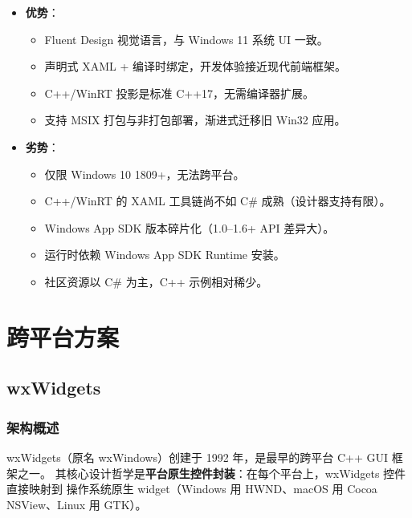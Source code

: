 \documentclass[12pt,a4paper,fontset=fandol]{ctexbook}
\begin{document}
\begin{compare}[title=WinUI 3 优劣分析]
\begin{itemize}
  \item \textbf{优势}：
    \begin{itemize}
      \item Fluent Design 视觉语言，与 Windows 11 系统 UI 一致。
      \item 声明式 XAML + 编译时绑定，开发体验接近现代前端框架。
      \item C++/WinRT 投影是标准 C++17，无需编译器扩展。
      \item 支持 MSIX 打包与非打包部署，渐进式迁移旧 Win32 应用。
    \end{itemize}
  \item \textbf{劣势}：
    \begin{itemize}
      \item 仅限 Windows 10 1809+，无法跨平台。
      \item C++/WinRT 的 XAML 工具链尚不如 C\# 成熟（设计器支持有限）。
      \item Windows App SDK 版本碎片化（1.0--1.6+ API 差异大）。
      \item 运行时依赖 Windows App SDK Runtime 安装。
      \item 社区资源以 C\# 为主，C++ 示例相对稀少。
    \end{itemize}
\end{itemize}
\end{compare}

\part{跨平台方案}

\chapter{wxWidgets}

\section{架构概述}

wxWidgets（原名 wxWindows）创建于 1992 年，是最早的跨平台 C++ GUI 框架之一。
其核心设计哲学是\textbf{平台原生控件封装}：在每个平台上，wxWidgets 控件直接映射到
操作系统原生 widget（Windows 用 HWND、macOS 用 Cocoa NSView、Linux 用 GTK）。
\end{document}
